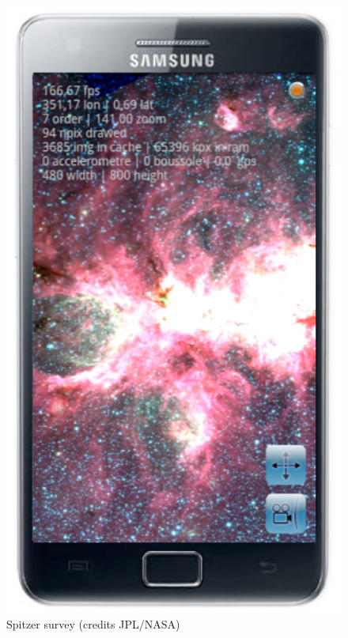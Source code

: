 \begin{figure}[h]
\includegraphics[scale=0.28]{part5/Schaaff_O28/O28_f3.eps}
\caption{Spitzer survey (credits JPL/NASA)} 
\label{O28:2}
\end{figure}

